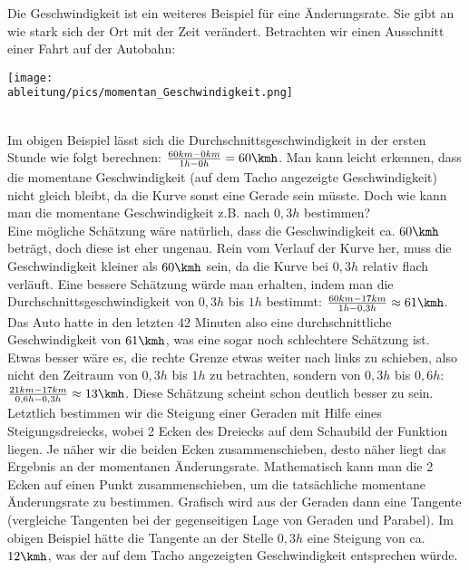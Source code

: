 Die Geschwindigkeit ist ein weiteres Beispiel für eine Änderungsrate. Sie gibt an wie stark sich der Ort mit der Zeit verändert. Betrachten wir einen Ausschnitt einer Fahrt auf der Autobahn:\\
\begin{minipage}[t]{\textwidth}
	\centering\texttt{[image: \\ableitung/pics/momentan\_Geschwindigkeit.png]}
\end{minipage}\\
Im obigen Beispiel lässt sich die Durchschnittsgeschwindigkeit in der ersten Stunde wie folgt berechnen: \(\frac{60km-0km}{1h-0h}=60\kmh\). Man kann leicht erkennen, dass die momentane Geschwindigkeit (auf dem Tacho angezeigte Geschwindigkeit) nicht gleich bleibt, da die Kurve sonst eine Gerade sein müsste. Doch wie kann man die momentane Geschwindigkeit z.B. nach \(0,3h\) bestimmen?\\
Eine mögliche Schätzung wäre natürlich, dass die Geschwindigkeit ca. \(60\kmh\) beträgt, doch diese ist eher ungenau. Rein vom Verlauf der Kurve her, muss die Geschwindigkeit kleiner als \(60\kmh\) sein, da die Kurve bei \(0,3h\) relativ flach verläuft. Eine bessere Schätzung würde man erhalten, indem man die Durchschnittsgeschwindigkeit von \(0,3h\) bis \(1h\) bestimmt: \(\frac{60km-17km}{1h-0,3h}\approx61\kmh\). Das Auto hatte in den letzten 42 Minuten also eine durchschnittliche Geschwindigkeit von \(61\kmh\), was eine sogar noch schlechtere Schätzung ist.\\
Etwas besser wäre es, die rechte Grenze etwas weiter nach links zu schieben, also nicht den Zeitraum von \(0,3h\) bis \(1h\) zu betrachten, sondern von \(0,3h\) bis \(0,6h\): \(\frac{21km-17km}{0,6h-0,3h}\approx13\kmh\). Diese Schätzung scheint schon deutlich besser zu sein.\\
Letztlich bestimmen wir die Steigung einer Geraden mit Hilfe eines Steigungsdreiecks, wobei 2 Ecken des Dreiecks auf dem Schaubild der Funktion liegen. Je näher wir die beiden Ecken zusammenschieben, desto näher liegt das Ergebnis an der momentanen Änderungsrate. Mathematisch kann man die 2 Ecken auf einen Punkt zusammenschieben, um die tatsächliche momentane Änderungsrate zu bestimmen. Grafisch wird aus der Geraden dann eine Tangente (vergleiche Tangenten bei der gegenseitigen Lage von Geraden und Parabel). Im obigen Beispiel hätte die Tangente an der Stelle \(0,3h\) eine Steigung von ca. \(12\kmh\), was der auf dem Tacho angezeigten Geschwindigkeit entsprechen würde.\\\newpage
